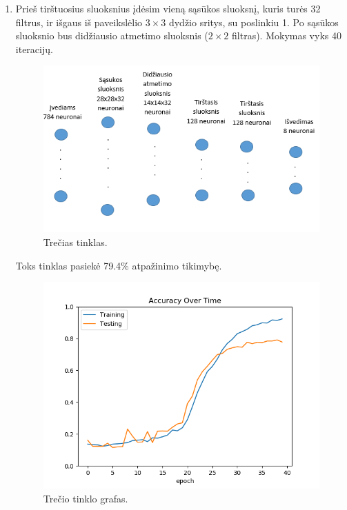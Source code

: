 \documentclass{VUMIFInfKursinis}
\begin{document}
\begin{enumerate}
    
    \newpage
    
    \item Prieš tirštuosius sluoksnius įdėsim vieną sąsūkos sluoksnį, kuris turės 32 filtrus, ir išgaus iš paveikslėlio $3\times3$ dydžio sritys, su poslinkiu 1. Po sąsūkos sluoksnio bus didžiausio atmetimo sluoksnis ($2\times2$ filtras). Mokymas vyks 40 iteracijų.
    
    
    \begin{figure}[h!]
    \centering
    \includegraphics[scale=0.8]{img/tinklas3}
    \caption{Trečias tinklas.}
    \label{fig:tinklas3}
    \end{figure}
    
    
    Toks tinklas pasiekė 79.4\% atpažinimo tikimybę.
    
    
    \begin{figure}[h!]
    \centering
    \includegraphics[scale=0.6]{img/grafas3}
    \caption{Trečio tinklo grafas.}
    \label{fig:grafas3}
    \end{figure}
    

\end{enumerate}
\end{document}
